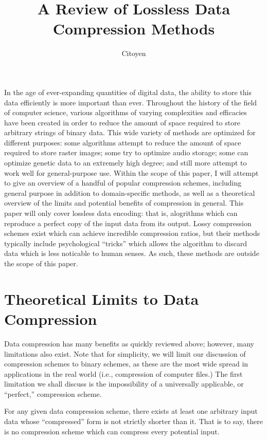 \documentclass[12pt]{article}
\title{A Review of Lossless Data Compression Methods}
\author{Citoyen}
\begin{document}
\maketitle

In the age of ever-expanding quantities of digital data, the ability
to store this data efficiently is more important than ever. Throughout
the history of the field of computer science, various algorithms of
varying complexities and efficacies have been created in order to
reduce the amount of space required to store arbitrary strings of
binary data. This wide variety of methods are optimized for different
purposes: some algorithms attempt to reduce the amount of space
required to store raster images; some try to optimize audio storage;
some can optimize genetic data to an extremely high degree; and still
more attempt to work well for general-purpose use. Within the scope of
this paper, I will attempt to give an overview of a handful of popular
compression schemes, including general purpose in addition to
domain-specific methods, as well as a theoretical overview of the
limits and potential benefits of compression in general. This paper
will only cover lossless data encoding: that is, alogrithms which can
reproduce a perfect copy of the input data from its output. Lossy
compression schemes exist which can achieve incredible compression
ratios, but their methods typically include psychological ``tricks''
which allows the algorithm to discard data which is less noticable to
human senses. As such, these methods are outside the scope of this
paper.

\section{Theoretical Limits to Data Compression}

Data compression has many benefits as quickly reviewed above; however,
many limitations also exist. Note that for simplicity, we will limit
our discussion of compression schemes to binary schemes, as these are
the most wide spread in applications in the real world (i.e.,
compression of computer files.) The first limitation we shall discuss
is the impossibility of a universally applicable, or ``perfect,''
compression scheme.

\begin{Theorem}
  \label{imperfect-compression}
  For any given data compression scheme, there exists at least one
  arbitrary input data whose ``compressed'' form is not strictly
  shorter than it. That is to say, there is no compression scheme
  which can compress every potential input.
\end{Theorem}
\end{document}
